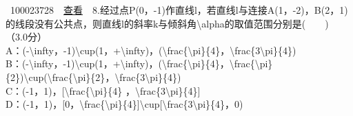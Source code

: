\documentclass[]{article}
\begin{document}
~{{100023728}~~\href{../question/viewQuestionDetail.jsp?questionID=100023728\&testPaperId=100229072}{查看}~~8.经过点P(0，-1)作直线l，若直线l与连接A(1，-2)，B(2，1)的线段没有公共点，则直线l的斜率k与倾斜角{\textbackslash{}alpha}的取值范围分别是(　　)\\
\hspace*{0.333em}\hspace*{0.333em}（3.0分）\\
\hspace*{0.333em}\hspace*{0.333em}\hspace*{0.333em}\hspace*{0.333em}\hspace*{0.333em}\hspace*{0.333em}\hspace*{0.333em}\hspace*{0.333em}A：(-{\textbackslash{}infty}，-1){\textbackslash{}cup}(1，+{\textbackslash{}infty})，({\textbackslash{}frac\{\textbackslash{}pi\}\{4\}}，{\textbackslash{}frac\{3\textbackslash{}pi\}\{4\}})\\[2\baselineskip]\hspace*{0.333em}\hspace*{0.333em}\hspace*{0.333em}\hspace*{0.333em}\hspace*{0.333em}\hspace*{0.333em}\hspace*{0.333em}\hspace*{0.333em}B：(-{\textbackslash{}infty}，-1){\textbackslash{}cup}(1，+{\textbackslash{}infty})，({\textbackslash{}frac\{\textbackslash{}pi\}\{4\}}，{\textbackslash{}frac\{\textbackslash{}pi\}\{2\}}){\textbackslash{}cup}({\textbackslash{}frac\{\textbackslash{}pi\}\{2\}}，{\textbackslash{}frac\{3\textbackslash{}pi\}\{4\}})\\[2\baselineskip]\hspace*{0.333em}\hspace*{0.333em}\hspace*{0.333em}\hspace*{0.333em}\hspace*{0.333em}\hspace*{0.333em}\hspace*{0.333em}\hspace*{0.333em}C：(-1，1)，{[}{\textbackslash{}frac\{\textbackslash{}pi\}\{4\}}
，{\textbackslash{}frac\{3\textbackslash{}pi\}\{4\}}{]}\\[2\baselineskip]\hspace*{0.333em}\hspace*{0.333em}\hspace*{0.333em}\hspace*{0.333em}\hspace*{0.333em}\hspace*{0.333em}\hspace*{0.333em}\hspace*{0.333em}D：(-1，1)，{[}0，{\textbackslash{}frac\{\textbackslash{}pi\}\{4\}}{]}{\textbackslash{}cup}{[}{\textbackslash{}frac\{3\textbackslash{}pi\}\{4\}}，0)\\[2\baselineskip]}
\end{document}
